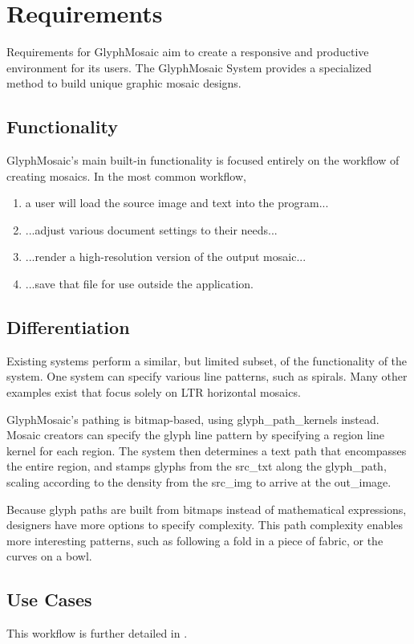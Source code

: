 \section{Requirements}
Requirements for GlyphMosaic aim to create a responsive and productive environment for its users.
The GlyphMosaic System provides a specialized method to build unique graphic mosaic designs.


\subsection{Functionality}
GlyphMosaic’s main built-in functionality is focused entirely on the workflow of creating mosaics.
In the most common workflow,
\begin{enumerate}
      \item a user will load the source image and text into the program...
      \item ...adjust various document settings to their needs...
      \item ...render a high-resolution version of the output mosaic...
      \item ...save that file for use outside the application.
\end{enumerate}


\subsection{Differentiation}
Existing systems perform a similar, but limited subset, of the functionality of the system.
One system can specify various line patterns, such as spirals.
Many other examples exist that focus solely on LTR horizontal mosaics.

GlyphMosaic's pathing is \gls{bitmap}-based, using \glspl{glyph_path_kernel} instead.
Mosaic creators can specify the glyph line pattern by specifying a region line kernel for each region.
The system then determines a text path that encompasses the entire region, and stamps glyphs from the \gls{src_txt} along the \gls{glyph_path}, scaling according to the \gls{density} from the \gls{src_img} to arrive at the \gls{out_image}.

Because glyph paths are built from bitmaps instead of mathematical expressions, designers have more options to specify complexity.
This path complexity enables more interesting patterns, such as following a fold in a piece of fabric, or the curves on a bowl.

\subsection{Use Cases}
\label{sec:use_cases}

\begin{itemize}
\end{itemize}

This workflow is further detailed in .